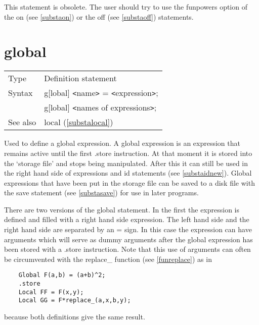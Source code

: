 \noindent This statement is obsolete. The 
user should try to use the funpowers option of the on (see 
\ref{substaon}) or the off (see \ref{substaoff}) statements. 
\vspace{10mm}


\section{global}
\label{substaglobal}

\noindent \begin{tabular}{ll}
Type & Definition statement\\
Syntax & g[lobal] {\tt<}name{\tt>} = {\tt<}expression{\tt>}; \\
       & g[lobal] {\tt<}names of expressions{\tt>};
\\ See also & local (\ref{substalocal})
\end{tabular} \vspace{4mm}

\noindent Used to define a global 
expression. A global expression is an expression that 
remains active until the first .store instruction. At that 
moment it is stored into the `storage file' and stops being manipulated. After this it can 
still be used in the right hand side of expressions and id 
statements (see \ref{substaidnew}). Global expressions that have been put 
in the storage file can be saved to a disk file with the 
save statement (see \ref{substasave}) for use in later programs.

\noindent There are two versions of the global statement. In the first the 
expression is defined and filled with a right hand side expression. The left 
hand side and the right hand side are separated by an = sign. In this case 
the expression can have arguments which will serve as
dummy arguments after the global expression has been 
stored with a .store instruction. Note that this use of arguments can often 
be circumvented with the replace\_ function (see \ref{funreplace}) as in
\begin{verbatim}
    Global F(a,b) = (a+b)^2;
    .store
    Local FF = F(x,y);
    Local GG = F*replace_(a,x,b,y);
\end{verbatim}
because both definitions give the same result.


